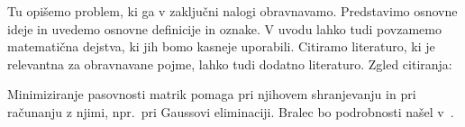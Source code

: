 Tu opišemo problem, ki ga v zaključni nalogi obravnavamo. Predstavimo osnovne ideje in uvedemo
osnovne definicije in oznake. V uvodu lahko tudi povzamemo matematična dejstva, ki jih bomo
kasneje uporabili. Citiramo literaturo, ki je relevantna za obravnavane pojme, lahko tudi dodatno literaturo.
\medskip
\noindent Zgled citiranja:

\medskip
Minimiziranje pasovnosti matrik pomaga pri njihovem shranjevanju in pri računanju z njimi, npr.~pri Gaussovi eliminaciji. Bralec bo podrobnosti našel v~\cite{Chinn, George, Strang}.